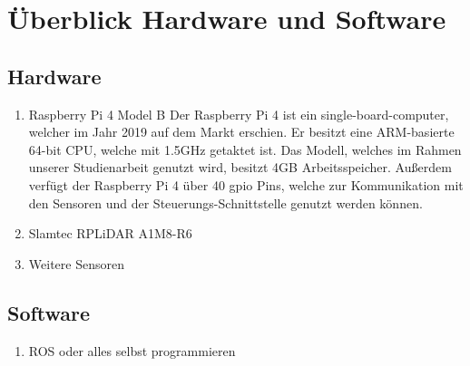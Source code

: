 \section{Überblick Hardware und Software}

\subsection{Hardware}
\begin{enumerate}
    \item Raspberry Pi 4 Model B
    Der Raspberry Pi 4 ist ein single-board-computer, welcher im Jahr 2019 auf dem Markt erschien. Er besitzt eine ARM-basierte 64-bit CPU, welche mit 1.5GHz getaktet ist. Das Modell, welches im Rahmen unserer Studienarbeit genutzt wird, besitzt 4GB Arbeitsspeicher. Außerdem verfügt der Raspberry Pi 4 über 40 \acf{gpio} Pins, welche zur Kommunikation mit den Sensoren und der Steuerungs-Schnittstelle genutzt werden können. \cite{RasPi2023}

    \item Slamtec RPLiDAR A1M8-R6
  
    
    \item Weitere Sensoren


\end{enumerate}

\subsection{Software}
\begin{enumerate}
    \item ROS oder alles selbst programmieren
\end{enumerate}

\newpage

